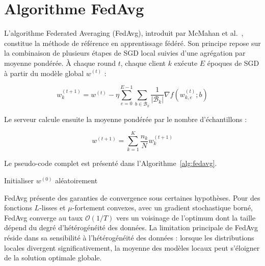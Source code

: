 \documentclass[12pt,a4paper]{report}
\begin{document}
\section{Algorithme FedAvg}

L'algorithme Federated Averaging (FedAvg), introduit par McMahan et al.~\cite{mcmahan2017}, constitue la m\'{e}thode de r\'{e}f\'{e}rence en apprentissage f\'{e}d\'{e}r\'{e}. Son principe repose sur la combinaison de plusieurs \'{e}tapes de SGD local suivies d'une agr\'{e}gation par moyenne pond\'{e}r\'{e}e. \`{A} chaque round $t$, chaque client $k$ ex\'{e}cute $E$ \'{e}poques de SGD \`{a} partir du mod\`{e}le global $w^{(t)}$ :

\begin{equation}
w_k^{(t+1)} = w^{(t)} - \eta \sum_{e=0}^{E-1} \sum_{b \in \mathcal{B}_k} \frac{1}{|\mathcal{B}_k|} \nabla f(w_{k,e}^{(t)}; b)
\label{eq:fedavg_local}
\end{equation}

Le serveur calcule ensuite la moyenne pond\'{e}r\'{e}e par le nombre d'\'{e}chantillons :

\begin{equation}
w^{(t+1)} = \sum_{k=1}^{K} \frac{n_k}{N} w_k^{(t+1)}
\label{eq:fedavg_agg}
\end{equation}

Le pseudo-code complet est pr\'{e}sent\'{e} dans l'Algorithme~\ref{alg:fedavg}.

\begin{algorithm}[H]
\SetAlgoLined
\DontPrintSemicolon
{}
Initialiser $w^{(0)}$ al\'{e}atoirement\;
\caption{FedAvg --- Federated Averaging}
\label{alg:fedavg}
\end{algorithm}

FedAvg pr\'{e}sente des garanties de convergence sous certaines hypoth\`{e}ses. Pour des fonctions $L$-lisses et $\mu$-fortement convexes, avec un gradient stochastique born\'{e}, FedAvg converge au taux $\mathcal{O}(1/T)$ vers un voisinage de l'optimum dont la taille d\'{e}pend du degr\'{e} d'h\'{e}t\'{e}rog\'{e}n\'{e}it\'{e} des donn\'{e}es. La limitation principale de FedAvg r\'{e}side dans sa sensibilit\'{e} \`{a} l'h\'{e}t\'{e}rog\'{e}n\'{e}it\'{e} des donn\'{e}es : lorsque les distributions locales divergent significativement, la moyenne des mod\`{e}les locaux peut s'\'{e}loigner de la solution optimale globale.
\end{document}

